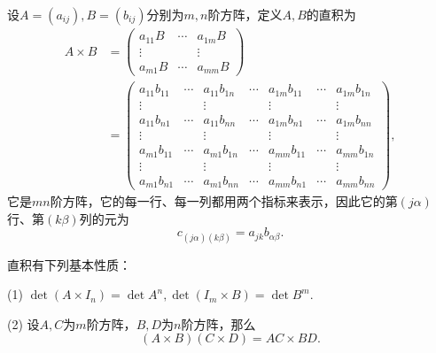 设$A=(a_{ij}),B=(b_{ij})$分别为$m,n$阶方阵，定义$A,B$的直积为
\begin{align*}
	A\times B
	&=\begin{pmatrix}
		a_{11}B &\cdots &a_{1m}B\\
		\vdots & & \vdots\\
		a_{m1}B & \cdots& a_{mm}B
	\end{pmatrix}\\
&=\begin{pmatrix}
	a_{11}b_{11} & \cdots & a_{11}b_{1n} & \cdots &a_{1m}b_{11} & \cdots &a_{1m}b_{1n}\\
	\vdots & &\vdots & &\vdots & & \vdots\\
	a_{11}b_{n1} & \cdots & a_{11}b_{nn} & \cdots &a_{1m}b_{n1} & \cdots &a_{1m}b_{nn}\\
	\vdots & &\vdots & &\vdots & & \vdots\\
	a_{m1}b_{11} & \cdots & a_{m1}b_{1n} & \cdots &a_{mm}b_{11} & \cdots &a_{mm}b_{1n}\\
	\vdots & &\vdots & &\vdots & & \vdots\\
	a_{m1}b_{n1} & \cdots & a_{m1}b_{nn} & \cdots &a_{mm}b_{n1} & \cdots &a_{mm}b_{nn}
\end{pmatrix},
\end{align*}
它是$mn$阶方阵，它的每一行、每一列都用两个指标来表示，因此它的第$(j\alpha)$行、第$(k\beta)$列的元为
\[c_{(j\alpha)(k\beta)}=a_{jk}b_{\alpha\beta}.\]

直积有下列基本性质：

(1)\hypertarget{3.4.3.1}{}
$\det(A\times I_n)=\det A^n,\det(I_m\times B)=\det B^m$.

(2)\hypertarget{3.4.3.1}{}
设$A,C$为$m$阶方阵，$B,D$为$n$阶方阵，那么
\[(A\times B)(C\times D)=AC\times BD.\]

